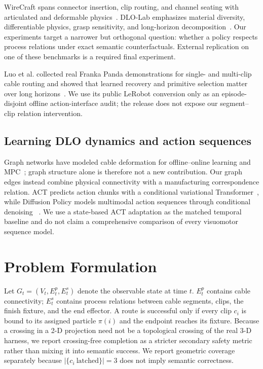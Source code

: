 \documentclass[journal]{IEEEtran}
\begin{document}
WireCraft spans connector insertion, clip routing, and channel seating with
articulated and deformable physics~\cite{zhu2026wirecraft}.  DLO-Lab emphasizes
material diversity, differentiable physics, grasp sensitivity, and long-horizon
decomposition~\cite{cao2026dlolab}.  Our experiments target a narrower but
orthogonal question: whether a policy respects process relations under exact
semantic counterfactuals.  External replication on one of these benchmarks is
a required final experiment.

Luo et al. collected real Franka Panda demonstrations for single- and
multi-clip cable routing and showed that learned recovery and primitive
selection matter over long horizons~\cite{luo2024multistage}.  We use its public
LeRobot conversion only as an episode-disjoint offline action-interface audit;
the release does not expose our segment--clip relation intervention.

\subsection{Learning DLO dynamics and action sequences}

Graph networks have modeled cable deformation for offline--online learning and
MPC~\cite{wang2022offlineonline}; graph structure alone is therefore not a new
contribution.  Our graph edges instead combine physical connectivity with a
manufacturing correspondence relation.  ACT predicts action chunks with a
conditional variational Transformer~\cite{zhao2023act}, while Diffusion Policy
models multimodal action sequences through conditional denoising
~\cite{chi2023diffusion}.  We use a state-based ACT adaptation as the matched
temporal baseline and do not claim a comprehensive comparison of every
visuomotor sequence model.

\section{Problem Formulation}

Let $G_t=(V_t,E_t^{p},E_t^{s})$ denote the observable state at time $t$.
$E_t^{p}$ contains cable connectivity; $E_t^{s}$ contains process relations
between cable segments, clips, the finish fixture, and the end effector.  A
route is successful only if every clip $c_i$ is bound to its assigned particle
$\pi(i)$ and the endpoint reaches its fixture.  Because a crossing in a 2-D
projection need not be a topological crossing of the real 3-D harness, we
report crossing-free completion as a stricter secondary safety metric rather
than mixing it into semantic success. We report geometric coverage separately because
$\lvert\{c_i\ \text{latched}\}\rvert=3$ does not imply semantic correctness.
\end{document}
